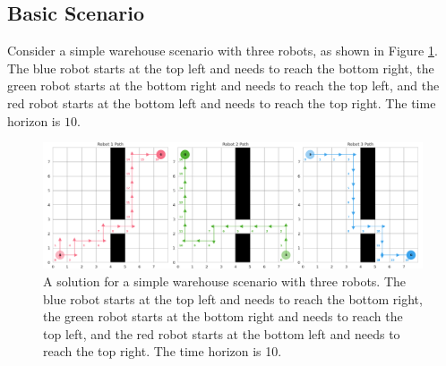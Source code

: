 \documentclass[8pt]{article}
\begin{document}
\subsection{Basic Scenario}
Consider a simple warehouse scenario with three robots, as shown in Figure \ref{fig:warehouse_solution}. The blue robot starts at the top left and needs to reach the bottom right, the green robot starts at the bottom right and needs to reach the top left, and the red robot starts at the bottom left and needs to reach the top right. The time horizon is $10$.
    \begin{figure}[H]
    \includegraphics[width=\textwidth]{figures/warehouse_solution.png}
    \caption{A solution for a simple warehouse scenario with three robots. The blue robot starts at the top left and needs to reach the bottom right, the green robot starts at the bottom right and needs to reach the top left, and the red robot starts at the bottom left and needs to reach the top right. The time horizon is 10.}
    \label{fig:warehouse_solution}
\end{figure}
\newpage
\end{document}
